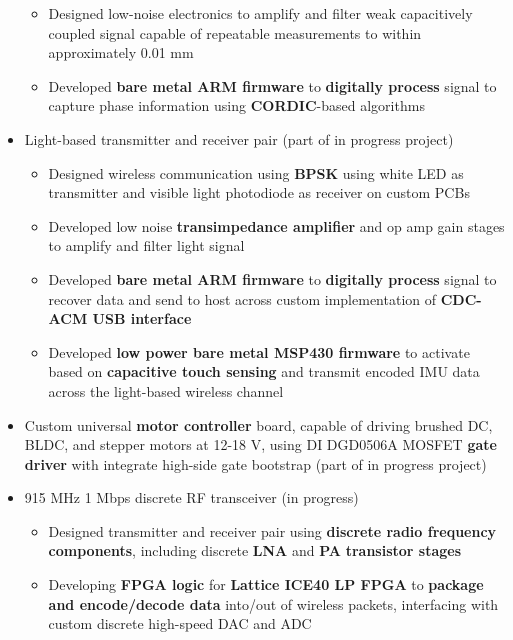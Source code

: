 \documentclass{my_resume}
\begin{document}
\begin{itemize}[noitemsep]
\begin{itemize}[noitemsep]
          \item Designed low-noise electronics to amplify and filter weak capacitively coupled signal capable of repeatable measurements to within approximately 0.01 mm
          \item Developed \textbf{bare metal ARM firmware} to \textbf{digitally process} signal to capture phase information using \textbf{CORDIC}-based algorithms
        \end{itemize}
      \item Light-based transmitter and receiver pair (part of in progress project)
        \begin{itemize}[noitemsep]
          \item Designed wireless communication using \textbf{BPSK} using white LED as transmitter and visible light photodiode as receiver on custom PCBs
          \item Developed low noise \textbf{transimpedance amplifier} and op amp gain stages to amplify and filter light signal
          \item Developed \textbf{bare metal ARM firmware} to \textbf{digitally process} signal to recover data and send to host across custom implementation of \textbf{CDC-ACM USB interface}
          \item Developed \textbf{low power bare metal MSP430 firmware} to activate based on \textbf{capacitive touch sensing} and transmit encoded IMU data across the light-based wireless channel
        \end{itemize}
      \item Custom universal \textbf{motor controller} board, capable of driving brushed DC, BLDC, and stepper motors at 12-18 V, using DI DGD0506A MOSFET \textbf{gate driver} with integrate high-side gate bootstrap (part of in progress project)
      \item 915 MHz 1 Mbps discrete RF transceiver (in progress)
        \begin{itemize}[noitemsep]
          \item Designed transmitter and receiver pair using \textbf{discrete radio frequency components}, including discrete \textbf{LNA} and \textbf{PA} \textbf{transistor stages}
          \item Developing \textbf{FPGA logic} for \textbf{Lattice ICE40 LP FPGA} to \textbf{package and encode/decode data} into/out of wireless packets, interfacing with custom discrete high-speed DAC and ADC
        \end{itemize}
\end{itemize}
\end{document}
